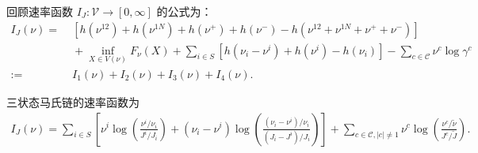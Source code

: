 回顾速率函数 $I_J:\mathcal{V}\to[0,\infty]$ 的公式为：
\begin{equation*}\label{ratefunction1}
	\begin{split}
		I_J(\nu) =&\; \left[h\left(\nu^{12}\right)+h\left(\nu^{1N}\right)
		+h\left(\nu^+\right)+h\left(\nu^-\right)-h\left(\nu^{12}+\nu^{1N}+\nu^++\nu^-\right)\right] \\
		&\;+\inf_{X\in V(\nu)}F_{\nu}(X)+\sum_{i\in S}\left[ h\left(\nu_i-\nu^i\right)+h\left(\nu^i\right)
		-h\left(\nu_i\right)\right]-\sum_{c\in\mathcal{C}}\nu^c\log\gamma^c\\
		:=&\;I_1(\nu)+I_2(\nu)+I_3(\nu)+I_4(\nu).
	\end{split}
\end{equation*}
\begin{proposition}
三状态马氏链的速率函数为
\begin{align*}
I_J(\nu) =
\sum_{i\in S} \left[\nu^{i}\log \left(\frac{\nu^{i}/\nu_i}{J^i/J_i}\right) + (\nu_i - \nu^i)\log \left(\frac{(\nu_i - \nu^i)/\nu_i}{(J_i - J^i)/J_i} \right)
\right]
+ \sum_{c \in \mathcal{C}, |c|\neq 1} \nu^{c} \log \left(\frac{\nu^{c}/\tilde{\nu}}{J^c/\tilde{J}}\right).
\end{align*}
\end{proposition}
